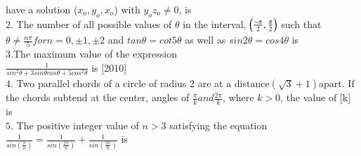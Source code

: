 \documentclass[journal,12pt,twocolumn]{IEEEtran}
\theoremstyle{remark}
\begin{document}
have a solution ($x_{o},y_{o},x_{o}$) with $y_{o}z_{o}\neq0$, is\hfill{}
\\

$2$. The number of all possible values of $\theta$ in the interval,
$\left(\frac{-\pi}{2},\frac{\pi}{2}\right)$  such that $\theta\neq\frac{n\pi}{5} for n=0,\pm1,\pm2 $ and $tan\theta=cot5\theta $ as well as $sin2\theta=cos4\theta$  is \hfill{}
\\

$3$.The maximum value of the expression
\\$\frac{1}{sin^2\theta+3sin\theta cos\theta+5cos^2\theta}$ is  \hfill{[2010]}
\\


$4$. Two parallel chords of a circle of radius 2 are at a distance$    \left(\sqrt{3}+1\right) $\space apart. If the chords subtend at the center, angles of $\frac{\pi}{k} and \frac{2\pi}{k}$, where $k>0$, the value of [k] is \hfill{}
\\

$5$. The positive integer value of $n>3$ satisfying the equation $\frac{1}{sin\left(\frac{\pi}{n}\right)}=\frac{1}{sin\left(\frac{2\pi}{n}\right)}+\frac{1}{sin\left(\frac{3\pi}{n}\right)}$ is\hfill{}
\end{document}
